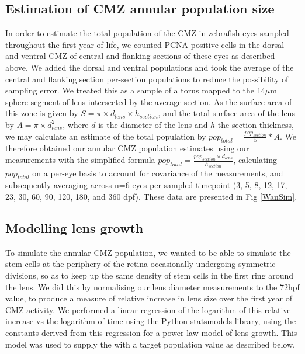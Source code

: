 \subsection{Estimation of CMZ annular population size}
\label{sec:lenspopest}
In order to estimate the total population of the CMZ in zebrafish eyes sampled throughout the first year of life, we counted PCNA-positive cells in the dorsal and ventral CMZ of central and flanking sections of these eyes as described above. We added the dorsal and ventral populations and took the average of the central and flanking section per-section populations to reduce the possibility of sampling error. We treated this as a sample of a torus mapped to the 14$\mu$m sphere segment of lens intersected by the average section. As the surface area of this zone is given by $S = \pi \times d_{lens} \times h_{section}$, and the total surface area of the lens by $A = \pi \times d_{lens}^2$, where $d$ is the diameter of the lens and $h$ the section thickness, we may calculate an estimate of the total population by $pop_{total} = \frac{pop_{section}}{S} * A$. We therefore obtained our annular CMZ population estimates using our measurements with the simplified formula $pop_{total}=\frac{pop_{section} \times d_{lens}}{h_{section}}$, calculating $pop_{total}$ on a per-eye basis to account for covariance of the measurements, and subsequently averaging across n=6 eyes per sampled timepoint (3, 5, 8, 12, 17, 23, 30, 60, 90, 120, 180, and 360 dpf). These data are presented in Fig \ref{WanSim}.

\subsection{Modelling lens growth}
To simulate the annular CMZ population, we wanted to be able to simulate the stem cells at the periphery of the retina occasionally undergoing symmetric divisions, so as to keep up the same density of stem cells in the first ring around the lens. We did this by normalising our lens diameter measurements to the 72hpf value, to produce a measure of relative increase in lens size over the first year of CMZ activity. We performed a linear regression of the logarithm of this relative increase vs the logarithm of time using the Python statsmodels library, using the constants derived from this regression for a power-law model of lens growth. This model was used to supply the  with a target population value as described below.

